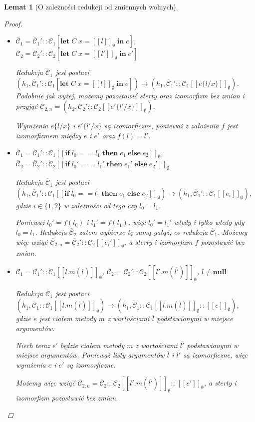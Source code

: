 \documentclass[]{pracamgr}
\renewcommand \| {\hspace{0.75em} | \hspace{0.75em} }
\renewcommand \[ {[\![}
\renewcommand \] {]\!]}
\newtheorem{lemma}{Lemat}
\theoremstyle{definition}
\newcommand{\jlet}{\mathbf{let}\xspace}
\newcommand{\jin}{\mathbf{in}\xspace}
\newcommand{\jif}{\mathbf{if}\xspace}
\newcommand{\jthen}{\mathbf{then}\xspace}
\newcommand{\jelse}{\mathbf{else}\xspace}
\newcommand{\jnull}{\mathbf{null}\xspace}
\newcommand{\letin}[4]{\jlet\; #1\; #2 = #3\; \jin\; #4\xspace}
\newcommand{\ite}[3]{\jif\; #1\; \jthen\; #2\; \jelse\; #3\xspace}
\newcommand{\ctxt}{\mathcal{C}\xspace}
\newcommand{\ctxts}{\overline{\ctxt}}
\begin{document}
\begin{lemma}[O zależności redukcji od zmiennych wolnych]{\ }
\begin{proof}
\begin{itemize}
\item $\ctxts_1 = \ctxts_1'::\ctxt_1[\letin{C}{x}{\[ l\] _\emptyset}{e}]$, \;\;
      $\ctxts_2 = \ctxts_2'::\ctxt_2[\letin{C}{x}{\[ l'\] _\emptyset}{e'}]$
      
Redukcja $\ctxts_1$ jest postaci
$(h_1, \ctxts_1' :: \ctxt_1[\letin{C}{x}{\[ l\] _\emptyset}{e}]) \rightarrow
 (h_1, \ctxts_1' :: \ctxt_1\[ e\{l/x\}\] _\emptyset)$.
Podobnie jak wyżej, możemy pozostawić sterty oraz izomorfizm bez zmian i przyjąć
$\ctxts_{2,n} = (h_2, \ctxts_2' :: \ctxt_2\[ e'\{l'/x\}\] _\emptyset)$.

Wyrażenia $e\{l/x\}$ i $e'\{l'/x\}$ są izomorficzne, ponieważ z założenia $f$ jest izomorfizmem
między $e$ i $e'$ oraz $f(l) = l'$.

\item $\ctxts_1 = \ctxts_1'::\ctxt_1\[\ite{ l_0 == l_1}{e_1}{e_2}\]_\emptyset$, \;\;
      $\ctxts_2 = \ctxts_2'::\ctxt_2\[\ite{ l_0' == l_1'}{e_1'}{e_2'}\]_\emptyset$
      
Redukcja $\ctxts_1$ jest postaci
$(h_1, \ctxts_1'::\ctxt_1\[ \ite{ l_0 == l_1}{e_1}{e_2}\] _\emptyset\!) \rightarrow \!(h_1, \ctxts_1':: \ctxt_1\[ e_i \] _\emptyset)$,
gdzie $i \in \{ 1,2 \}$ w zależności od tego czy $l_0 = l_1$.

Ponieważ $l_0' = f(l_0)$ i $l_1' = f(l_1)$, więc $l_0' = l_1'$ wtedy i tylko wtedy gdy $l_0 = l_1$.
Redukcja $\ctxts_2$ zatem wybierze tę samą gałąź, co redukcja $\ctxts_1$.
Możemy więc wziąć $\ctxts_{2,n} = \ctxts_2'::\ctxt_2\[ e_i' \]_\emptyset$,
a sterty i izomorfizm $f$ pozostawić bez zmian.
      
\item $\ctxts_1 = \ctxts_1'::\ctxt_1\[ l.m(\overline{l})\]_\emptyset$, \;\;
      $\ctxts_2 = \ctxts_2'::\ctxt_2\[ l'.m(\overline{l'})\]_\emptyset$, \;\;
      $l \neq \jnull$
      
Redukcja $\ctxts_1$ jest postaci
$(h_1, \ctxts_1 :: \ctxt_1 \[ l.m(\overline{l})\]_\emptyset) \rightarrow
 (h_1, \ctxts_1 :: \ctxt_1 \[ l.m(\overline{l})\]_\emptyset::\[ e\]_\emptyset)$, gdzie
$e$ jest ciałem metody $m$ z wartościami $\overline{l}$ podstawionymi w miejsce argumentów.

Niech teraz $e'$ będzie ciałem metody $m$ z wartościami $\overline{l'}$
podstawionymi w miejsce argumentów.
Ponieważ listy argumentów $\overline{l}$ i $\overline{l'}$ są izomorficzne, więc wyrażenia
$e$ i $e'$ są izomorficzne.

Możemy więc wziąć
$ \ctxts_{2,n} = \ctxts_2 :: \ctxt_2 \[ l'.m(\overline{l'})\]_\emptyset::\[ e' \]_\emptyset$,
a sterty i izomorfizm pozostawić bez zmian.


\end{itemize}
\end{proof}
\end{lemma}
\end{document}
